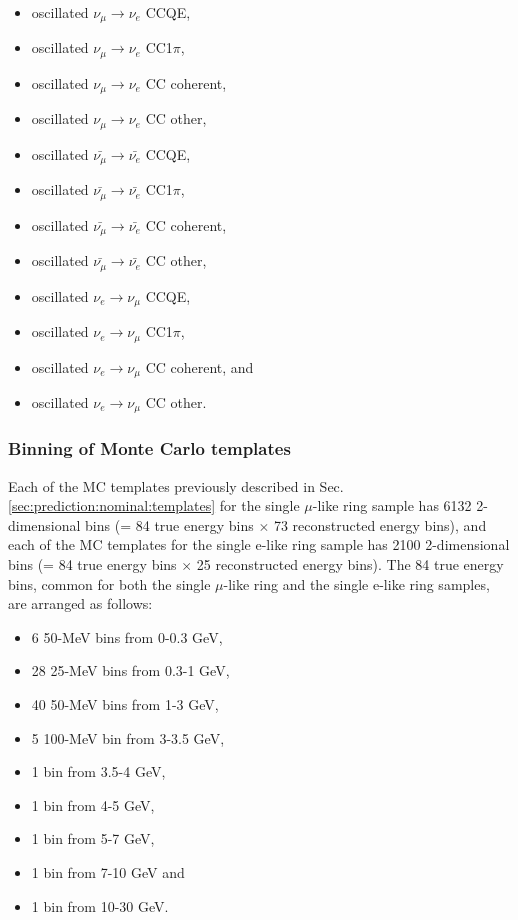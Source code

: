 \begin{itemize}
\item  oscillated $\nu_{\mu} \rightarrow \nu_{e}$ CCQE,
\item  oscillated $\nu_{\mu} \rightarrow \nu_{e}$ CC1$\pi$,
\item  oscillated $\nu_{\mu} \rightarrow \nu_{e}$ CC coherent,
\item  oscillated $\nu_{\mu} \rightarrow \nu_{e}$ CC other,
\item  oscillated $\bar{\nu_{\mu}} \rightarrow \bar{\nu_{e}}$ CCQE,
\item  oscillated $\bar{\nu_{\mu}} \rightarrow \bar{\nu_{e}}$ CC1$\pi$,
\item  oscillated $\bar{\nu_{\mu}} \rightarrow \bar{\nu_{e}}$ CC coherent,
\item  oscillated $\bar{\nu_{\mu}} \rightarrow \bar{\nu_{e}}$ CC other,
\item  oscillated $\nu_{e} \rightarrow \nu_{\mu}$ CCQE,
\item  oscillated $\nu_{e} \rightarrow \nu_{\mu}$ CC1$\pi$,
\item  oscillated $\nu_{e} \rightarrow \nu_{\mu}$ CC coherent, and
\item  oscillated $\nu_{e} \rightarrow \nu_{\mu}$ CC other.
\end{itemize}



\subsubsection{Binning of Monte Carlo templates}
\label{sec:prediction:nominal:binning}

Each of the MC templates previously described in Sec. \ref{sec:prediction:nominal:templates}
for the single $\mu$-like ring sample
has 6132 2-dimensional bins (= 84 true energy bins $\times$ 73 reconstructed energy bins),
and each of the MC templates for the single e-like ring sample
has 2100 2-dimensional bins (= 84 true energy bins $\times$ 25 reconstructed energy bins).
The 84 true energy bins, common for both the single $\mu$-like ring and the single e-like ring samples, are arranged as follows:
\begin{itemize}
 \item   6 50-MeV bins from 0-0.3 GeV, 
 \item   28 25-MeV bins from 0.3-1 GeV, 
 \item   40 50-MeV bins from 1-3 GeV, 
 \item   5 100-MeV bin from 3-3.5 GeV, 
 \item   1 bin from 3.5-4 GeV, 
 \item   1 bin from 4-5 GeV, 
 \item   1 bin from 5-7 GeV, 
 \item   1 bin from 7-10 GeV and
 \item   1 bin from 10-30 GeV.
\end{itemize}

